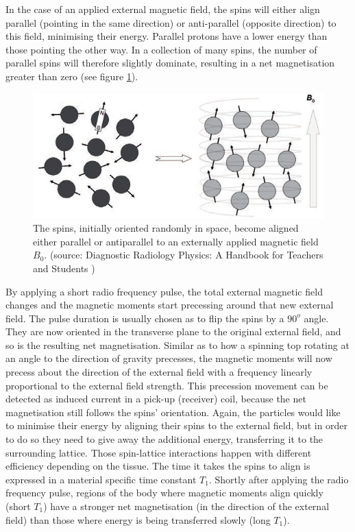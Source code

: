 In the case of an applied external magnetic field, the spins will either align parallel (pointing in the same direction) or anti-parallel (opposite direction) to this field, minimising their energy.
Parallel protons have a lower energy than those pointing the other way.
In a collection of many spins, the number of parallel spins will therefore slightly dominate, resulting in a net magnetisation greater than zero (see figure \ref{fig:spin_align}).

\begin{figure}[h!]
\centering
\includegraphics[width=0.8\linewidth]{../fig/intro/spin_align}
\caption{The spins, initially oriented randomly in space, become aligned either parallel or antiparallel to an externally applied magnetic field $B_0$. (source: Diagnostic Radiology Physics: A Handbook for Teachers and Students \cite{Maidment2014})}
\label{fig:spin_align}
\end{figure}

By applying a short radio frequency pulse, the total external magnetic field changes and the magnetic moments start precessing around that new external field.
The pulse duration is usually chosen as to flip the spins by a $90^o$ angle.
They are now oriented in the transverse plane to the original external field, and so is the resulting net magnetisation.
Similar as to how a spinning top rotating at an angle to the direction of gravity precesses, the magnetic moments will now precess about the direction of the external field with a frequency linearly proportional to the external field strength.
This precession movement can be detected as induced current in a pick-up (receiver) coil, because the net magnetisation still follows the spins' orientation. 
Again, the particles would like to minimise their energy by aligning their spins to the external field, but in order to do so they need to give away the additional energy, transferring it to the surrounding lattice.
Those spin-lattice interactions happen with different efficiency depending on the tissue.
The time it takes the spins to align is expressed in a material specific time constant $T_1$.
Shortly after applying the radio frequency pulse, regions of the body where magnetic moments align quickly (short $T_1$) have a stronger net magnetisation (in the direction of the external field) than those where energy is being transferred slowly (long $T_1$).


